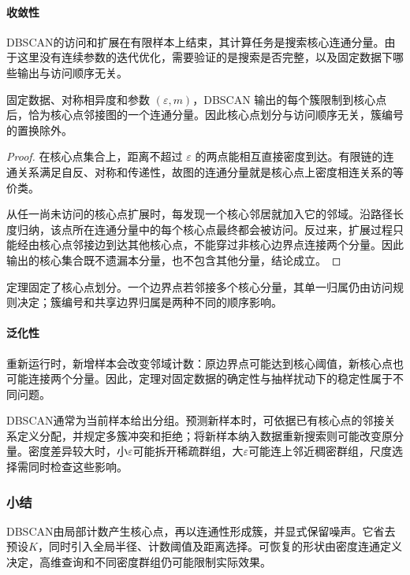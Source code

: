 \paragraph{收敛性}
DBSCAN的访问和扩展在有限样本上结束，其计算任务是搜索核心连通分量。由于这里没有连续参数的迭代优化，需要验证的是搜索是否完整，以及固定数据下哪些输出与访问顺序无关。

\begin{theorem}
 \label{thm:clustering-dbscan}
 固定数据、对称相异度和参数 $(\varepsilon,m)$，DBSCAN 输出的每个簇限制到核心点后，恰为核心点邻接图的一个连通分量。因此核心点划分与访问顺序无关，簇编号的置换除外。
\end{theorem}
\begin{proof}
在核心点集合上，距离不超过 $\varepsilon$ 的两点能相互直接密度到达。有限链的连通关系满足自反、对称和传递性，故图的连通分量就是核心点上密度相连关系的等价类。

从任一尚未访问的核心点扩展时，每发现一个核心邻居就加入它的邻域。沿路径长度归纳，该点所在连通分量中的每个核心点最终都会被访问。反过来，扩展过程只能经由核心点邻接边到达其他核心点，不能穿过非核心边界点连接两个分量。因此输出的核心集合既不遗漏本分量，也不包含其他分量，结论成立。
\end{proof}

定理固定了核心点划分。一个边界点若邻接多个核心分量，其单一归属仍由访问规则决定；簇编号和共享边界归属是两种不同的顺序影响。

\paragraph{泛化性}
重新运行时，新增样本会改变邻域计数：原边界点可能达到核心阈值，新核心点也可能连接两个分量。因此，定理对固定数据的确定性与抽样扰动下的稳定性属于不同问题。

DBSCAN通常为当前样本给出分组。预测新样本时，可依据已有核心点的邻接关系定义分配，并规定多簇冲突和拒绝；将新样本纳入数据重新搜索则可能改变原分量。密度差异较大时，小$\varepsilon$可能拆开稀疏群组，大$\varepsilon$可能连上邻近稠密群组，尺度选择需同时检查这些影响。

\subsubsection{小结}

DBSCAN由局部计数产生核心点，再以连通性形成簇，并显式保留噪声。它省去预设$K$，同时引入全局半径、计数阈值及距离选择。可恢复的形状由密度连通定义决定，高维查询和不同密度群组仍可能限制实际效果。

